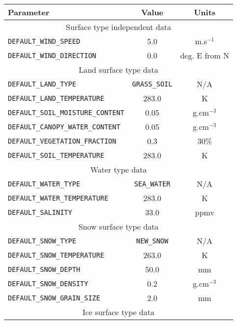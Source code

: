\begin{table}[htp]
  \centering
  \begin{tabular}{l c c}
    \hline
    \sffamily\textbf{Parameter} & \sffamily\textbf{Value}  & \sffamily\textbf{Units} \\
    \hline\hline
    \multicolumn{3}{c}{\textsf{Surface type independent data}}\\
    \hline
    \texttt{DEFAULT\_WIND\_SPEED}             & 5.0        & m.s$^{-1}$\\
    \texttt{DEFAULT\_WIND\_DIRECTION}         & 0.0        & deg. E from N\\[0.2cm]
    \multicolumn{3}{c}{\textsf{Land surface type data}}\\
    \hline
    \texttt{DEFAULT\_LAND\_TYPE}              & \texttt{GRASS\_SOIL}& N/A \\
    \texttt{DEFAULT\_LAND\_TEMPERATURE}       & 283.0      & K\\
    \texttt{DEFAULT\_SOIL\_MOISTURE\_CONTENT} & 0.05       & g.cm$^{-3}$\\
    \texttt{DEFAULT\_CANOPY\_WATER\_CONTENT}  & 0.05       & g.cm$^{-3}$\\
    \texttt{DEFAULT\_VEGETATION\_FRACTION}    & 0.3        & 30\%\\
    \texttt{DEFAULT\_SOIL\_TEMPERATURE}       & 283.0      & K\\[0.2cm]
    \multicolumn{3}{c}{\textsf{Water type data}}\\
    \hline
    \texttt{DEFAULT\_WATER\_TYPE}             & \texttt{SEA\_WATER} & N/A\\
    \texttt{DEFAULT\_WATER\_TEMPERATURE}      & 283.0      & K\\
    \texttt{DEFAULT\_SALINITY}                & 33.0       & ppmv\\[0.2cm]
    \multicolumn{3}{c}{\textsf{Snow surface type data}}\\
    \hline
    \texttt{DEFAULT\_SNOW\_TYPE}              & \texttt{NEW\_SNOW}  & N/A\\
    \texttt{DEFAULT\_SNOW\_TEMPERATURE}       & 263.0      & K\\
    \texttt{DEFAULT\_SNOW\_DEPTH}             & 50.0       & mm\\
    \texttt{DEFAULT\_SNOW\_DENSITY}           & 0.2        & g.cm$^{-3}$\\
    \texttt{DEFAULT\_SNOW\_GRAIN\_SIZE}       & 2.0        & mm\\[0.2cm]
    \multicolumn{3}{c}{\textsf{Ice surface type data}}\\

\end{tabular}
\end{table}
